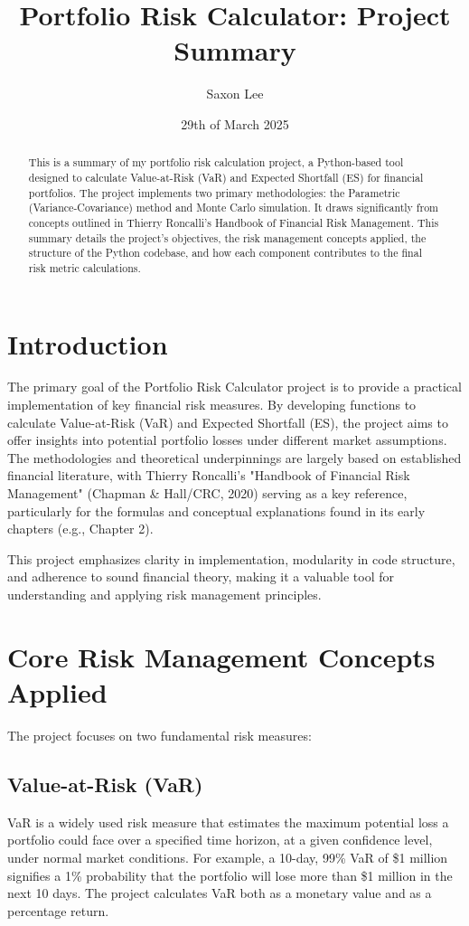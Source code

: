 \documentclass[11pt,a4paper]{article}
\title{Portfolio Risk Calculator: Project Summary}
\author{Saxon Lee} %
\date{29th of March 2025}
\begin{document}
\maketitle
\begin{abstract}
This is a summary of my portfolio risk calculation project, a Python-based tool designed to calculate Value-at-Risk (VaR) and Expected Shortfall (ES) for financial portfolios. The project implements two primary methodologies: the Parametric (Variance-Covariance) method and Monte Carlo simulation. It draws significantly from concepts outlined in Thierry Roncalli's Handbook of Financial Risk Management. This summary details the project's objectives, the risk management concepts applied, the structure of the Python codebase, and how each component contributes to the final risk metric calculations.
\end{abstract}

\tableofcontents
\newpage

\section{Introduction}
The primary goal of the Portfolio Risk Calculator project is to provide a practical implementation of key financial risk measures. By developing functions to calculate Value-at-Risk (VaR) and Expected Shortfall (ES), the project aims to offer insights into potential portfolio losses under different market assumptions. The methodologies and theoretical underpinnings are largely based on established financial literature, with Thierry Roncalli's "Handbook of Financial Risk Management" (Chapman \& Hall/CRC, 2020) serving as a key reference, particularly for the formulas and conceptual explanations found in its early chapters (e.g., Chapter 2).

This project emphasizes clarity in implementation, modularity in code structure, and adherence to sound financial theory, making it a valuable tool for understanding and applying risk management principles.

\section{Core Risk Management Concepts Applied}
The project focuses on two fundamental risk measures:

\subsection{Value-at-Risk (VaR)}
VaR is a widely used risk measure that estimates the maximum potential loss a portfolio could face over a specified time horizon, at a given confidence level, under normal market conditions. For example, a 10-day, 99\% VaR of \$1 million signifies a 1\% probability that the portfolio will lose more than \$1 million in the next 10 days. The project calculates VaR both as a monetary value and as a percentage return.
\end{document}
